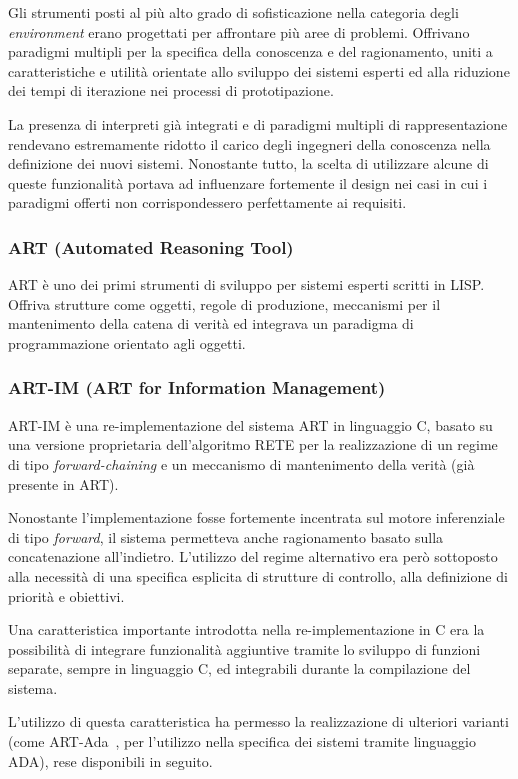 Gli strumenti posti al più alto grado di sofisticazione nella categoria degli \emph{environment} erano progettati per affrontare più aree di problemi. Offrivano paradigmi multipli per la specifica della conoscenza e del ragionamento, uniti a caratteristiche e utilità orientate allo sviluppo dei sistemi esperti ed alla riduzione dei tempi di iterazione nei processi di prototipazione. 

La presenza di interpreti già integrati e di paradigmi multipli di rappresentazione rendevano estremamente ridotto il carico degli ingegneri della conoscenza nella definizione dei nuovi sistemi. Nonostante tutto, la scelta di utilizzare alcune di queste funzionalità portava ad influenzare fortemente il design nei casi in cui i paradigmi offerti non corrispondessero perfettamente ai requisiti.~\cite{development1993}

\subsubsection{ART (Automated Reasoning Tool)}
ART è uno dei primi strumenti di sviluppo per sistemi esperti scritti in LISP. Offriva strutture come oggetti, regole di produzione, meccanismi per il mantenimento della catena di verità ed integrava un paradigma di programmazione orientato agli oggetti.~\cite{art1998}

\subsubsection{ART-IM (ART for Information Management)}
ART-IM è una re-implementazione del sistema ART in linguaggio C, basato su una versione proprietaria dell'algoritmo RETE per la realizzazione di un regime di tipo \emph{forward-chaining} e un meccanismo di mantenimento della verità (già presente in ART).

Nonostante l'implementazione fosse fortemente incentrata sul motore inferenziale di tipo \emph{forward}, il sistema permetteva anche ragionamento basato sulla concatenazione all'indietro. L'utilizzo del regime alternativo era però sottoposto alla necessità di una specifica esplicita di strutture di controllo, alla definizione di priorità e obiettivi.

Una caratteristica importante introdotta nella re-implementazione in C era la possibilità di integrare funzionalità aggiuntive tramite lo sviluppo di funzioni separate, sempre in linguaggio C, ed integrabili durante la compilazione del sistema.

L'utilizzo di questa caratteristica ha permesso la realizzazione di ulteriori varianti (come ART-Ada~\cite{artadanasa1990}, per l'utilizzo nella specifica dei sistemi tramite linguaggio ADA), rese disponibili in seguito.

